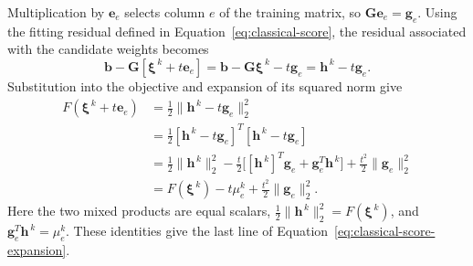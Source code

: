\documentclass[a4paper,12pt]{article}
\newcommand{\vect}[1]{\boldsymbol{#1}}
\newcommand{\matr}[1]{\boldsymbol{#1}}
\begin{document}
Multiplication by $\vect{e}_e$ selects column $e$ of the training matrix, so $\matr{G}\vect{e}_e=\vect{g}_e$. Using the fitting residual defined in Equation~\eqref{eq:classical-score}, the residual associated with the candidate weights becomes
\[
 \vect{b}-\matr{G}[\vect{\xi}^{\,k}+t\vect{e}_e]
 =\vect{b}-\matr{G}\vect{\xi}^{\,k}-t\vect{g}_e
 =\vect{h}^{\,k}-t\vect{g}_e.
\]
Substitution into the objective and expansion of its squared norm give
\begin{equation}
 \begin{aligned}
 F(\vect{\xi}^{\,k}+t\vect{e}_e)
 &=\frac12\|\vect{h}^{\,k}-t\vect{g}_e\|_2^2\\
 &=\frac12[\vect{h}^{\,k}-t\vect{g}_e]^T
             [\vect{h}^{\,k}-t\vect{g}_e]\\
 &=\frac12\|\vect{h}^{\,k}\|_2^2
   -\frac{t}{2}\bigl[[\vect{h}^{\,k}]^T\vect{g}_e
                    +\vect{g}_e^T\vect{h}^{\,k}\bigr]
   +\frac{t^2}{2}\|\vect{g}_e\|_2^2\\
 &=F(\vect{\xi}^{\,k})-t\mu_e^k+\frac{t^2}{2}\|\vect{g}_e\|_2^2.
 \end{aligned}
 \label{eq:classical-score-expansion}
\end{equation}
Here the two mixed products are equal scalars, $\frac12\|\vect{h}^{\,k}\|_2^2=F(\vect{\xi}^{\,k})$, and $\vect{g}_e^T\vect{h}^{\,k}=\mu_e^k$. These identities give the last line of Equation~\eqref{eq:classical-score-expansion}.
\end{document}
